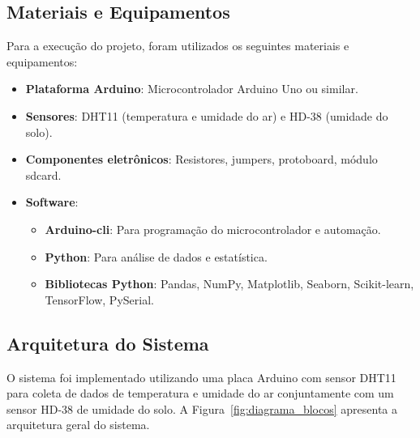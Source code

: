 \documentclass[12pt, a4paper]{article}
\begin{document}
\subsection{Materiais e Equipamentos}
Para a execução do projeto, foram utilizados os seguintes materiais e equipamentos:
\begin{itemize}
    \item \textbf{Plataforma Arduino}: Microcontrolador Arduino Uno ou similar.
    \item \textbf{Sensores}: DHT11 (temperatura e umidade do ar) e HD-38 (umidade do solo).
    \item \textbf{Componentes eletrônicos}: Resistores, jumpers, protoboard,  módulo sdcard.
    \item \textbf{Software}:
        \begin{itemize}
            \item \textbf{Arduino-cli}: Para programação do microcontrolador e automação.
            \item \textbf{Python}: Para análise de dados e estatística.
            \item \textbf{Bibliotecas Python}: Pandas, NumPy, Matplotlib, Seaborn, Scikit-learn, TensorFlow, PySerial.
        \end{itemize}
\end{itemize}

\subsection{Arquitetura do Sistema}
\label{sec:implementacao}

O sistema foi implementado utilizando uma placa Arduino com sensor DHT11 para coleta de dados de temperatura e umidade do ar conjuntamente com um sensor HD-38 de umidade do solo. A Figura~\ref{fig:diagrama_blocos} apresenta a arquitetura geral do sistema.
\end{document}
